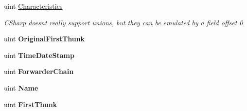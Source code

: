 \begin{DoxyCompactItemize}
\item 
uint \mbox{\hyperlink{struct_p_e_d_scanner_lib_1_1_struct_1_1_pe_header_reader_1_1_i_m_a_g_e___i_m_p_o_r_t___d_e_s_c_r_i_p_t_o_r_a9bc2e4d3a96d1b0d8b6a016d2c50ec5b}{Characteristics}}
\begin{DoxyCompactList}\small\item\em C\+Sharp doesnt really support unions, but they can be emulated by a field offset 0 \end{DoxyCompactList}\item 
\mbox{\label{struct_p_e_d_scanner_lib_1_1_struct_1_1_pe_header_reader_1_1_i_m_a_g_e___i_m_p_o_r_t___d_e_s_c_r_i_p_t_o_r_a1d0bcec932993eeb0c32c2c451646b04}} 
uint {\bfseries Original\+First\+Thunk}
\item 
\mbox{\label{struct_p_e_d_scanner_lib_1_1_struct_1_1_pe_header_reader_1_1_i_m_a_g_e___i_m_p_o_r_t___d_e_s_c_r_i_p_t_o_r_abedbc95fa8c8d2aca18d855f124b0307}} 
uint {\bfseries Time\+Date\+Stamp}
\item 
\mbox{\label{struct_p_e_d_scanner_lib_1_1_struct_1_1_pe_header_reader_1_1_i_m_a_g_e___i_m_p_o_r_t___d_e_s_c_r_i_p_t_o_r_ab76a038aad1305bd5d979ee3f1dcfdca}} 
uint {\bfseries Forwarder\+Chain}
\item 
\mbox{\label{struct_p_e_d_scanner_lib_1_1_struct_1_1_pe_header_reader_1_1_i_m_a_g_e___i_m_p_o_r_t___d_e_s_c_r_i_p_t_o_r_a8afb368f28f805e70555593af90001c2}} 
uint {\bfseries Name}
\item 
\mbox{\label{struct_p_e_d_scanner_lib_1_1_struct_1_1_pe_header_reader_1_1_i_m_a_g_e___i_m_p_o_r_t___d_e_s_c_r_i_p_t_o_r_a293f3893d4c65bcf7ab2ca47758c19bb}} 
uint {\bfseries First\+Thunk}
\end{DoxyCompactItemize}


